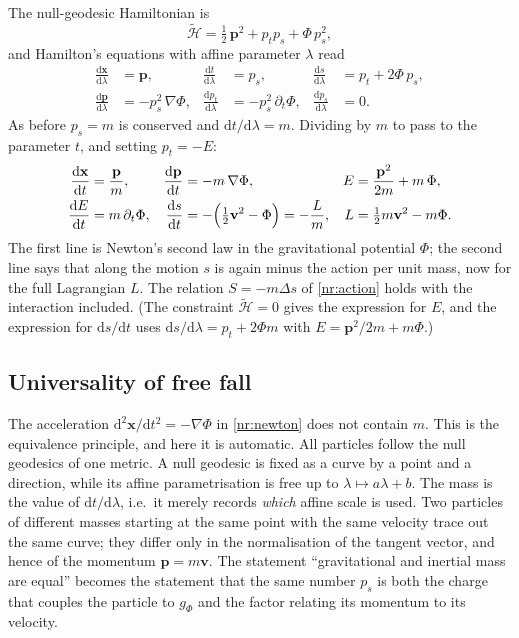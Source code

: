 The null-geodesic Hamiltonian is
\begin{equation}
  \tilde{\mathcal{H}}=\tfrac12\,\mathbf{p}^2+p_tp_s+\Phi\,p_s^2 ,
  \label{nr:HtildePhi}
\end{equation}
and Hamilton's equations with affine parameter $\lambda$ read
\begin{equation}
  \begin{aligned}
  \frac{\mathrm{d}\mathbf{x}}{\mathrm{d}\lambda}&=\mathbf{p}, &
  \frac{\mathrm{d}t}{\mathrm{d}\lambda}&=p_s, &
  \frac{\mathrm{d}s}{\mathrm{d}\lambda}&=p_t+2\Phi\,p_s,\\
  \frac{\mathrm{d}\mathbf{p}}{\mathrm{d}\lambda}&=-p_s^2\,\nabla\Phi, &
  \frac{\mathrm{d}p_t}{\mathrm{d}\lambda}&=-p_s^2\,\partial_t\Phi, &
  \frac{\mathrm{d}p_s}{\mathrm{d}\lambda}&=0 .
  \end{aligned}
  \label{nr:hamiltonPhi}
\end{equation}
As before $p_s=m$ is conserved and $\mathrm{d}t/\mathrm{d}\lambda=m$. Dividing
by $m$ to pass to the parameter $t$, and setting $p_t=-E$:
\begin{align}
  \frac{\mathrm{d}\mathbf{x}}{\mathrm{d}t}&=\frac{\mathbf{p}}{m},
  &\frac{\mathrm{d}\mathbf{p}}{\mathrm{d}t}&=-m\,\nabla\Phi,
  &E&=\frac{\mathbf{p}^2}{2m}+m\,\Phi,
  \label{nr:newton}\\
  \frac{\mathrm{d}E}{\mathrm{d}t}&=m\,\partial_t\Phi,
  &\frac{\mathrm{d}s}{\mathrm{d}t}&=-\Bigl(\tfrac12\mathbf{v}^2-\Phi\Bigr)=-\frac{L}{m},
  &L&=\tfrac12 m\mathbf{v}^2-m\Phi .
  \label{nr:sL}
\end{align}
The first line is Newton's second law in the gravitational potential $\Phi$;
the second line says that along the motion $s$ is again minus the action per
unit mass, now for the full Lagrangian $L$. The relation $S=-m\Delta s$ of
\eqref{nr:action} holds with the interaction included. (The constraint
$\tilde{\mathcal{H}}=0$ gives the expression for $E$, and the expression for
$\mathrm{d}s/\mathrm{d}t$ uses $\mathrm{d}s/\mathrm{d}\lambda=p_t+2\Phi m$ with
$E=\mathbf{p}^2/2m+m\Phi$.)

\subsection{Universality of free fall}

The acceleration $\mathrm{d}^2\mathbf{x}/\mathrm{d}t^2=-\nabla\Phi$ in
\eqref{nr:newton} does not contain $m$. This is the equivalence principle, and
here it is automatic. All particles follow the null geodesics of one metric. A
null geodesic is fixed as a curve by a point and a direction, while its
affine parametrisation is free up to $\lambda\mapsto a\lambda+b$. The mass is
the value of $\mathrm{d}t/\mathrm{d}\lambda$, i.e.\ it merely records \emph{which}
affine scale is used. Two particles of different masses starting at the same
point with the same velocity trace out the same curve; they differ only in the
normalisation of the tangent vector, and hence of the momentum
$\mathbf{p}=m\mathbf{v}$. The statement ``gravitational and inertial mass are
equal'' becomes the statement that the same number $p_s$ is both the charge
that couples the particle to $g_\Phi$ and the factor relating its momentum to
its velocity.

